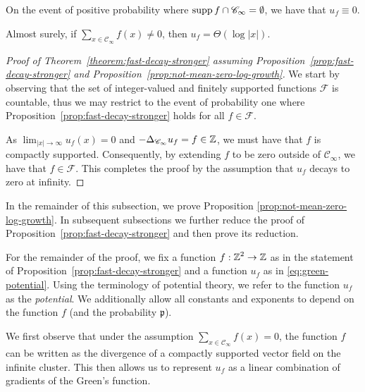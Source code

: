 \documentclass[12pt]{amsart}
\numberwithin{equation}{section}
\begin{document}
	\begin{remark}
		On the event of positive probability where $\mathrm{supp\,} f \cap \mathscr{C}_\infty = \emptyset$, we have that $u_f \equiv 0$.
	\end{remark}
	
	\begin{prop} \label{prop:not-mean-zero-log-growth}
		Almost surely, if $\sum_{x \in \mathscr{C}_{\infty}} f(x) \neq 0$, then $u_f = \Theta(\log|x|)$.
	\end{prop}
	
	
	\begin{proof}[Proof of Theorem~\ref{theorem:fast-decay-stronger} assuming Proposition~\ref{prop:fast-decay-stronger} and Proposition~\ref{prop:not-mean-zero-log-growth}]
		We start by observing that the set of integer-valued and finitely supported functions $\mathscr{F}$ is countable, 
		thus we may restrict to the event of probability one where Proposition~\ref{prop:fast-decay-stronger} holds for all $f \in \mathscr{F}$. 
		
		As $\lim_{|x| \to \infty} u_f(x) = 0$ and $-\Delta_{\mathscr{C}_{\infty}} u_f = f \in \operatorname{\mathbb{Z}}$, we must have that $f$ is compactly supported. Consequently, 
		by extending $f$ to be zero outside of $\mathscr{C}_{\infty}$, we have that $f \in \mathscr{F}$. This completes the proof by the assumption that $u_f$ decays to zero at infinity. 
	\end{proof} 
	
	
	In the remainder of this subsection, we prove Proposition \ref{prop:not-mean-zero-log-growth}. 
	In subsequent subsections we further reduce the proof of Proposition~\ref{prop:fast-decay-stronger}
	and then prove its reduction. 
	
	For the remainder of the proof, we fix a function $f: \operatorname{\mathbb{Z}}^2 \to \operatorname{\mathbb{Z}}$ as in the statement of Proposition~\ref{prop:fast-decay-stronger} and a function $u_f$ as in \eqref{eq:green-potential}. Using the terminology of potential theory, we refer to the function $u_f$ as the {\it potential}. We additionally allow all constants and exponents to depend on the function $f$ (and the probability $\mathfrak{p}$).
	
	We first observe that under the assumption $\sum_{x \in \mathscr{C}_\infty} f(x) = 0$, the function $f$ can be written as the divergence of a compactly supported vector field on the infinite cluster. This then allows us to represent $u_f$ as a linear combination of gradients of the Green's function. 
	
\end{document}
